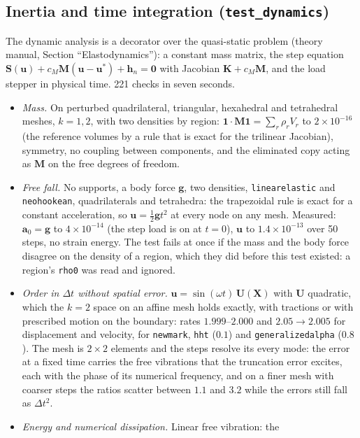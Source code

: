 \documentclass[11pt]{article}
\newcommand{\bX}{\bm{X}}
\newcommand{\bu}{\bm{u}}
\newcommand{\bK}{\bm{K}}
\newcommand{\bM}{\bm{M}}
\DeclareRobustCommand{\code}[1]{{\def\_{\textunderscore\allowbreak}\texttt{#1}}}
\begin{document}
\subsection{Inertia and time integration (\texttt{test\_dynamics})}
\label{sec:testdynamics}
The dynamic analysis is a decorator over the quasi-static problem (theory
manual, Section ``Elastodynamics''): a constant mass matrix, the step
equation $\bm S(\bm u) + c_M\bM(\bm u - \bm u^*) + \bm h_n = \bm 0$ with
Jacobian $\bK + c_M\bM$, and the load stepper in physical time.  221 checks
in seven seconds.
\begin{itemize}[nosep]
  \item \emph{Mass.}  On perturbed quadrilateral, triangular, hexahedral and
    tetrahedral meshes, $k = 1, 2$, with two densities by region:
    $\bm 1\cdot\bM\bm 1 = \sum_r\rho_r V_r$ to $2\times10^{-16}$ (the
    reference volumes by a rule that is exact for the trilinear Jacobian),
    symmetry, no coupling between components, and the eliminated copy acting
    as $\bM$ on the free degrees of freedom.
  \item \emph{Free fall.}  No supports, a body force $\bm g$, two densities,
    \code{linear\_elastic} and \code{neo\_hookean}, quadrilaterals and
    tetrahedra: the trapezoidal rule is exact for a constant acceleration, so
    $\bu = \tfrac12\bm g t^2$ at every node on any mesh.  Measured:
    $\bm a_0 = \bm g$ to $4\times10^{-14}$ (the step load is on at $t = 0$),
    $\bu$ to $1.4\times10^{-13}$ over 50 steps, no strain energy.  The test
    fails at once if the mass and the body force disagree on the density of
    a region, which they did before this test existed: a region's
    \code{rho0} was read and ignored.
  \item \emph{Order in $\Delta t$ without spatial error.}
    $\bu = \sin(\omega t)\,\bm U(\bX)$ with $\bm U$ quadratic, which the
    $k = 2$ space on an affine mesh holds exactly, with tractions or with
    prescribed motion on the boundary: rates $1.999$--$2.000$ and
    $2.05 \to 2.005$ for displacement and velocity, for \code{newmark},
    \code{hht} ($0.1$) and \code{generalized\_alpha} ($0.8$).  The mesh is
    $2\times2$ elements and the steps resolve its every mode: the error at a
    fixed time carries the free vibrations that the truncation error
    excites, each with the phase of its numerical frequency, and on a finer
    mesh with coarser steps the ratios scatter between $1.1$ and $3.2$ while
    the errors still fall as $\Delta t^2$.
  \item \emph{Energy and numerical dissipation.}  Linear free vibration: the

\end{itemize}
\end{document}
